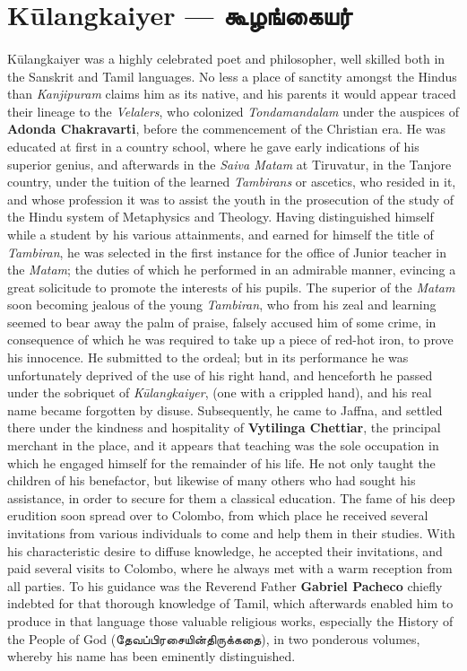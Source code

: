 \documentclass{article}
\newcommand{\TamilText}[1]{\texttamil{#1}}
\newcommand{\TamilBold}[1]{\texttamil{\textbf{#1}}}
\newcommand{\tam}[1]{\TamilText{#1}}
\newcommand{\tambold}[1]{\TamilBold{#1}}
\begin{document}
\section{K\={u}langkaiyer --- \tambold{கூழங்கையர்}}
\paragraph{}
K\={u}langkaiyer was a highly celebrated poet and philosopher, well skilled both in the Sanskrit and Tamil languages. No less a place of sanctity amongst the Hindus than \emph{Kanjipuram} claims him as its native, and his parents it would appear traced their lineage to the \emph{Velalers}, who colonized \emph{Tondamandalam} under the auspices of \textbf{Adonda Chakravarti}, before the commencement of the Christian era. He was educated at first in a country school, where he gave early indications of his superior genius, and afterwards in the \emph{Saiva Matam} at Tiruvatur, in the Tanjore country, under the tuition of the learned \emph{Tambirans} or ascetics, who resided in it, and whose profession it was to assist the youth in the prosecution of the study of the Hindu system of Metaphysics and Theology. Having distinguished himself while a student by his various attainments, and earned for himself the title of \emph{Tambiran}, he was selected in the first instance for the office of Junior teacher in the \emph{Matam}; the duties of which he performed in an admirable manner, evincing a great solicitude to promote the interests of his pupils. The superior of the \emph{Matam} soon becoming jealous of the young \emph{Tambiran}, who from his zeal and learning seemed to bear away the palm of praise, falsely accused him of some crime, in consequence of which he was required to take up a piece of red-hot iron, to prove his innocence. He submitted to the ordeal; but in its performance he was unfortunately deprived of the use of his right hand, and henceforth he passed under the sobriquet of \emph{K\={u}langkaiyer}, (one with a crippled hand), and his real name became forgotten by disuse. Subsequently, he came to Jaffna, and settled there under the kindness and hospitality of \textbf{Vytilinga Chettiar}, the principal merchant in the place, and it appears that teaching was the sole occupation in which he engaged himself for the remainder of his life. He not only taught the children of his benefactor, but likewise of many others who had sought his assistance, in order to secure for them a classical education. The fame of his deep erudition soon spread over to Colombo, from which place he received several invitations from various individuals to come and help them in their studies. With his characteristic desire to diffuse knowledge, he accepted their invitations, and paid several visits to Colombo, where he always met with a warm reception from all parties. To his guidance was the Reverend Father \textbf{Gabriel Pacheco} chiefly indebted for that thorough knowledge of Tamil, which afterwards enabled him to produce in that language those valuable religious works, especially the History of the People of God (\tam{தேவப்பிரசையின்திருக்கதை}), in two ponderous volumes, whereby his name has been eminently distinguished.
\end{document}
